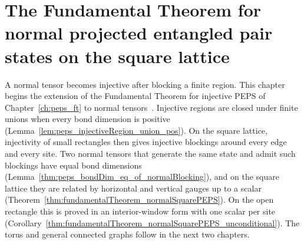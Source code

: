 \chapter{The Fundamental Theorem for normal projected entangled pair states on the square lattice}
\label{ch:peps_ft_normal_square}

A normal tensor becomes injective after blocking a finite region. This chapter
begins the extension of the Fundamental Theorem for injective PEPS of
Chapter~\ref{ch:peps_ft} to normal tensors~\cite{Molnar2018NormalPEPS}.
Injective regions are closed under finite unions when every bond dimension is
positive (Lemma~\ref{lem:peps_injectiveRegion_union_pos}). On the square
lattice, injectivity of small rectangles then gives injective blockings around
every edge and every site. Two normal tensors that generate the same state and
admit such blockings have equal bond dimensions
(Lemma~\ref{thm:peps_bondDim_eq_of_normalBlocking}), and on the square lattice
they are related by horizontal and vertical gauges up to a scalar
(Theorem~\ref{thm:fundamentalTheorem_normalSquarePEPS}). On the open rectangle
this is proved in an interior-window form with one scalar per site
(Corollary~\ref{thm:fundamentalTheorem_normalSquarePEPS_unconditional}). The
torus and general connected graphs follow in the next two chapters.



